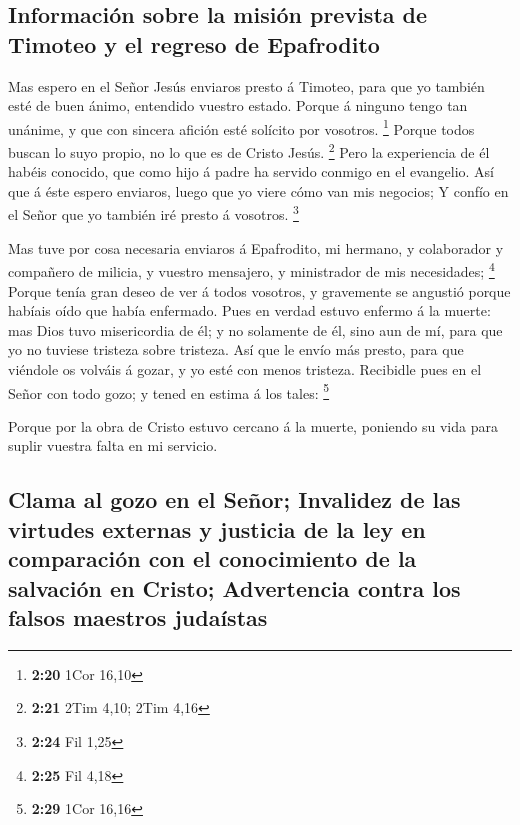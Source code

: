 \hypertarget{informaciuxf3n-sobre-la-misiuxf3n-prevista-de-timoteo-y-el-regreso-de-epafrodito}{%
\subsection{Información sobre la misión prevista de Timoteo y el regreso
de
Epafrodito}\label{informaciuxf3n-sobre-la-misiuxf3n-prevista-de-timoteo-y-el-regreso-de-epafrodito}}

 Mas espero en el Señor Jesús enviaros presto á Timoteo,
para que yo también esté de buen ánimo, entendido vuestro estado.
 Porque á ninguno tengo tan unánime, y que con sincera
afición esté solícito por vosotros. \footnote{\textbf{2:20} 1Cor 16,10}
 Porque todos buscan lo suyo propio, no lo que es de Cristo
Jesús. \footnote{\textbf{2:21} 2Tim 4,10; 2Tim 4,16}  Pero
la experiencia de él habéis conocido, que como hijo á padre ha servido
conmigo en el evangelio.  Así que á éste espero enviaros,
luego que yo viere cómo van mis negocios;  Y confío en el
Señor que yo también iré presto á vosotros. \footnote{\textbf{2:24} Fil
  1,25}

 Mas tuve por cosa necesaria enviaros á Epafrodito, mi
hermano, y colaborador y compañero de milicia, y vuestro mensajero, y
ministrador de mis necesidades; \footnote{\textbf{2:25} Fil 4,18}
 Porque tenía gran deseo de ver á todos vosotros, y
gravemente se angustió porque habíais oído que había enfermado.
 Pues en verdad estuvo enfermo á la muerte: mas Dios tuvo
misericordia de él; y no solamente de él, sino aun de mí, para que yo no
tuviese tristeza sobre tristeza.  Así que le envío más
presto, para que viéndole os volváis á gozar, y yo esté con menos
tristeza.  Recibidle pues en el Señor con todo gozo; y
tened en estima á los tales: \footnote{\textbf{2:29} 1Cor 16,16}

 Porque por la obra de Cristo estuvo cercano á la muerte,
poniendo su vida para suplir vuestra falta en mi servicio.

\hypertarget{clama-al-gozo-en-el-seuxf1or-invalidez-de-las-virtudes-externas-y-justicia-de-la-ley-en-comparaciuxf3n-con-el-conocimiento-de-la-salvaciuxf3n-en-cristo-advertencia-contra-los-falsos-maestros-judauxedstas}{%
\subsection{Clama al gozo en el Señor; Invalidez de las virtudes
externas y justicia de la ley en comparación con el conocimiento de la
salvación en Cristo; Advertencia contra los falsos maestros
judaístas}\label{clama-al-gozo-en-el-seuxf1or-invalidez-de-las-virtudes-externas-y-justicia-de-la-ley-en-comparaciuxf3n-con-el-conocimiento-de-la-salvaciuxf3n-en-cristo-advertencia-contra-los-falsos-maestros-judauxedstas}}

